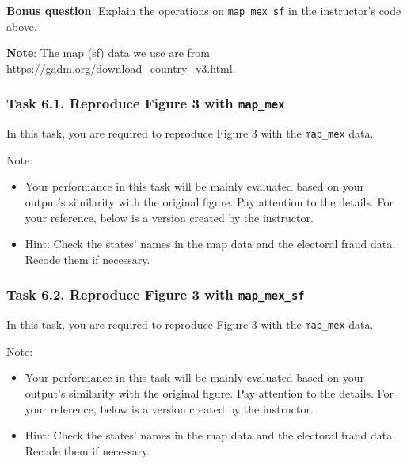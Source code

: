 \documentclass[
]{article}
\begin{document}
\textbf{Bonus question}: Explain the operations on \texttt{map\_mex\_sf}
in the instructor's code above.

\textbf{Note}: The map (sf) data we use are from
\url{https://gadm.org/download_country_v3.html}.

\clearpage

\hypertarget{task-6.1.-reproduce-figure-3-with-map_mex}{%
\subsubsection{\texorpdfstring{Task 6.1. Reproduce Figure 3 with
\texttt{map\_mex}}{Task 6.1. Reproduce Figure 3 with map\_mex}}\label{task-6.1.-reproduce-figure-3-with-map_mex}}

In this task, you are required to reproduce Figure 3 with the
\texttt{map\_mex} data.

Note:

\begin{itemize}
\item
  Your performance in this task will be mainly evaluated based on your
  output's similarity with the original figure. Pay attention to the
  details. For your reference, below is a version created by the
  instructor.
\item
  Hint: Check the states' names in the map data and the electoral fraud
  data. Recode them if necessary.
\end{itemize}

\clearpage

\hypertarget{task-6.2.-reproduce-figure-3-with-map_mex_sf}{%
\subsubsection{\texorpdfstring{Task 6.2. Reproduce Figure 3 with
\texttt{map\_mex\_sf}}{Task 6.2. Reproduce Figure 3 with map\_mex\_sf}}\label{task-6.2.-reproduce-figure-3-with-map_mex_sf}}

In this task, you are required to reproduce Figure 3 with the
\texttt{map\_mex} data.

Note:

\begin{itemize}
\item
  Your performance in this task will be mainly evaluated based on your
  output's similarity with the original figure. Pay attention to the
  details. For your reference, below is a version created by the
  instructor.
\item
  Hint: Check the states' names in the map data and the electoral fraud
  data. Recode them if necessary.
\end{itemize}
\end{document}
